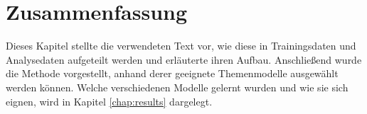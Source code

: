 \section{Zusammenfassung}
Dieses Kapitel stellte die verwendeten Text vor, wie diese in Trainingsdaten und Analysedaten aufgeteilt werden und erläuterte ihren Aufbau. Anschließend wurde die Methode vorgestellt, anhand derer geeignete Themenmodelle ausgewählt werden können. Welche verschiedenen Modelle gelernt wurden und wie sie sich eignen, wird in Kapitel \ref{chap:results} dargelegt.